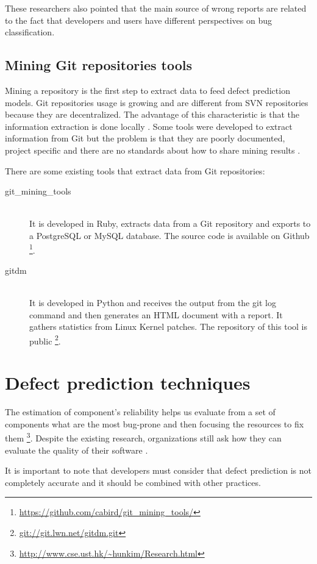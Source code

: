 These researchers also pointed that the main source of wrong reports are
related to the fact that developers and users have different perspectives on bug
classification.

\subsection{Mining Git repositories tools}
Mining a repository is the first step to extract data to feed defect prediction
models. Git repositories usage is growing and are different from SVN
repositories because they are decentralized. The advantage of this
characteristic is that the information extraction is done locally
\cite{Sadowski2011}. Some tools were developed to extract information from Git
but the problem is that they are poorly documented, project specific and there
are no standards about how to share mining results \cite{Carlsson638844}.

There are some existing tools that extract data from Git repositories:

\begin{description}
    \item[git\_mining\_tools] \hfill \\
    It is developed in Ruby, extracts data from a Git repository and exports to
    a PostgreSQL or MySQL database. The source code is available on Github
    \footnote{\url{https://github.com/cabird/git_mining_tools/}}.

    \item[gitdm] \hfill \\
    It is developed in Python and receives the output from the git log command
    and then generates an HTML document with a report. It gathers statistics
    from Linux Kernel patches. The repository of this tool is public
    \footnote{\url{git://git.lwn.net/gitdm.git}}.
\end{description}

\section{Defect prediction techniques}
The estimation of component's reliability helps us evaluate from a set of
components what are the most bug-prone and then focusing the resources to fix
them \footnote{\url{http://www.cse.ust.hk/~hunkim/Research.html}}. Despite the
existing research, organizations still ask how they can evaluate the quality of
their software \cite{815326}.

It is important to note that developers must consider that defect prediction
is not completely accurate and it should be combined with other practices.

